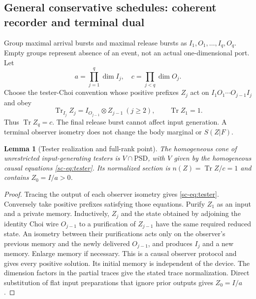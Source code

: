 \documentclass[11pt]{article}
\newtheorem{lemma}[theorem]{Lemma}
\theoremstyle{definition}
\theoremstyle{remark}
\newcommand{\Tr}{\operatorname{Tr}}
\begin{document}
\subsection{General conservative schedules: coherent recorder and terminal dual}
Group maximal arrival bursts and maximal release bursts as $I_1,O_1,\ldots,I_q,O_q$. Empty groups represent absence of an event, not an actual one-dimensional port. Let
\[
a=\prod_{j=1}^q\dim I_j,\quad
c=\prod_{j<q}\dim O_j.
\]
Choose the tester-Choi convention whose positive prefixes $Z_j$ act on $I_1O_1\cdots O_{j-1}I_j$ and obey
\begin{equation}\label{sc-eq:tester}
\Tr_{I_j}Z_j=I_{O_{j-1}}\otimes Z_{j-1}\ (j\ge2),
\qquad \Tr Z_1=1.
\end{equation}
Thus $\Tr Z_q=c$. The final release burst cannot affect input generation. A terminal observer isometry does not change the body marginal or $S(Z|F)$.

\begin{lemma}[Tester realization and full-rank point]\label{sc-lem:tester}
The homogeneous cone of unrestricted input-generating testers is $V\cap\mathrm{PSD}$, with $V$ given by the homogeneous causal equations \eqref{sc-eq:tester}. Its normalized section is $n(Z)=\Tr Z/c=1$ and contains $Z_0=I/a>0$.
\end{lemma}
\begin{proof}
Tracing the output of each observer isometry gives \eqref{sc-eq:tester}. Conversely take positive prefixes satisfying those equations. Purify $Z_1$ as an input and a private memory. Inductively, $Z_j$ and the state obtained by adjoining the identity Choi wire $O_{j-1}$ to a purification of $Z_{j-1}$ have the same required reduced state. An isometry between their purifications acts only on the observer's previous memory and the newly delivered $O_{j-1}$, and produces $I_j$ and a new memory. Enlarge memory if necessary. This is a causal observer protocol and gives every positive solution. Its initial memory is independent of the device. The dimension factors in the partial traces give the stated trace normalization. Direct substitution of flat input preparations that ignore prior outputs gives $Z_0=I/a$.
\end{proof}
\end{document}
